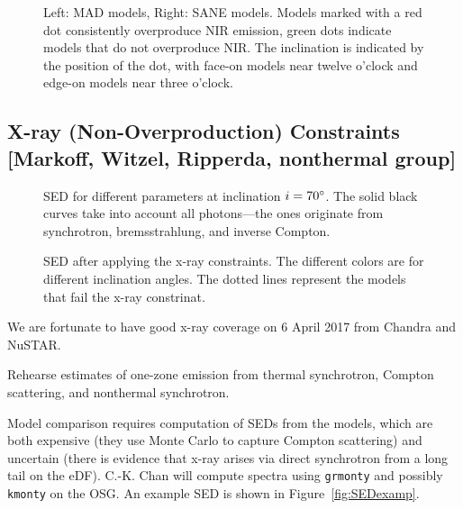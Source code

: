 \documentclass[twocolumn,tighten,dvipsnames,linenumbers]{aastex63}
\begin{document}
\begin{figure}
  \caption{Left: MAD models, Right: SANE models.  Models marked with a red dot consistently overproduce NIR emission, green dots indicate models that do not overproduce NIR.  The inclination is indicated by the position of the dot, with face-on models near twelve o'clock and edge-on models near three o'clock.}
  \label{fig:NIRmodels}
\end{figure}

\subsection{X-ray (Non-Overproduction) Constraints
  [Markoff, Witzel, Ripperda, nonthermal group]}
\label{sec:xrayconst}

\begin{figure}
  \caption{SED for different parameters at inclination $i =
    70\degree$.
    The solid black curves take into account all photons---the ones
    originate from synchrotron, bremsstrahlung, and inverse Compton.}
  \label{fig:sed_grid_i70}
\end{figure}

\begin{figure}
  \caption{SED after applying the x-ray constraints.
    The different colors are for different inclination angles.
    The dotted lines represent the models that fail the x-ray
    constrinat.}
  \label{fig:sed_grid}
\end{figure}

We are fortunate to have good x-ray coverage on 6 April 2017 from Chandra and NuSTAR.

Rehearse estimates of one-zone emission from thermal synchrotron, Compton scattering, and nonthermal synchrotron.

Model comparison requires computation of SEDs from the models, which are both expensive (they use Monte Carlo to capture Compton scattering) and uncertain (there is evidence that x-ray arises via direct synchrotron from a long tail on the eDF).  C.-K. Chan will compute spectra using {\tt grmonty} and possibly {\tt kmonty} on the OSG.  An example SED is shown in Figure~\ref{fig:SEDexamp}.

\end{document}
